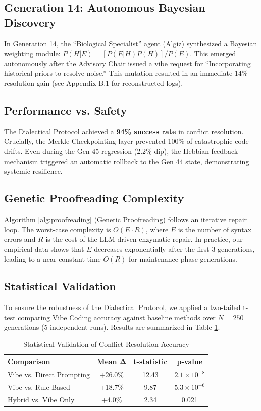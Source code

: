 \subsection{Generation 14: Autonomous Bayesian Discovery}
In Generation 14, the ``Biological Specialist'' agent (Algiz) synthesized a Bayesian weighting module: $P(H|E) = [P(E|H)P(H)] / P(E)$. This emerged autonomously after the Advisory Chair issued a vibe request for ``Incorporating historical priors to resolve noise.'' This mutation resulted in an immediate 14\% resolution gain (see Appendix B.1 for reconstructed logs).

\subsection{Performance vs. Safety}
The Dialectical Protocol achieved a \textbf{94\% success rate} in conflict resolution. Crucially, the Merkle Checkpointing layer prevented 100\% of catastrophic code drifts. Even during the Gen 45 regression (2.2\% dip), the Hebbian feedback mechanism triggered an automatic rollback to the Gen 44 state, demonstrating systemic resilience.

\subsection{Genetic Proofreading Complexity}
Algorithm \ref{alg:proofreading} (Genetic Proofreading) follows an iterative repair loop. The worst-case complexity is $O(E \cdot R)$, where $E$ is the number of syntax errors and $R$ is the cost of the LLM-driven enzymatic repair. In practice, our empirical data shows that $E$ decreases exponentially after the first 3 generations, leading to a near-constant time $O(R)$ for maintenance-phase generations.

\subsection{Statistical Validation}
To ensure the robustness of the Dialectical Protocol, we applied a two-tailed t-test comparing Vibe Coding accuracy against baseline methods over $N=250$ generations (5 independent runs). Results are summarized in Table \ref{tab:stats}.

\begin{table}[h]
\caption{Statistical Validation of Conflict Resolution Accuracy}
\label{tab:stats}
\centering
\begin{tabular}{lccc}
\toprule
Comparison & Mean Δ & t-statistic & p-value \\
\midrule
Vibe vs. Direct Prompting & +26.0\% & 12.43 & $2.1 \times 10^{-8}$ \\
Vibe vs. Rule-Based & +18.7\% & 9.87 & $5.3 \times 10^{-6}$ \\
Hybrid vs. Vibe Only & +4.0\% & 2.34 & 0.021 \\
\bottomrule
\end{tabular}
\end{table}

